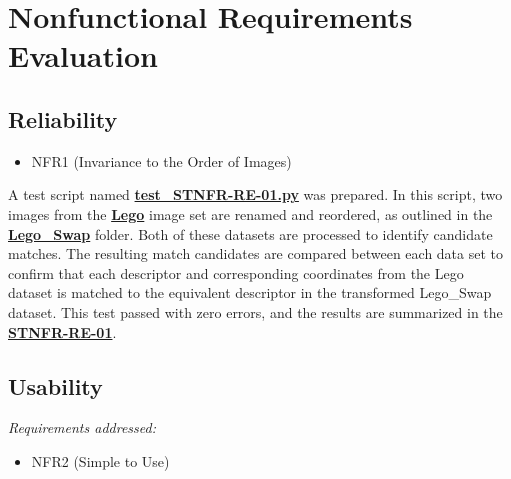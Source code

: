 \documentclass[12pt, titlepage]{article}
\begin{document}
\section{Nonfunctional Requirements Evaluation}
\subsection{Reliability}
\begin{itemize}
  \item NFR1 (Invariance to the Order of Images)
  \end{itemize}
A test script named \href{https://github.com/KiranSingh15/CAS-741-Image-Correspondences/blob/main/src/tests/test_STNFR-RE-01.py}{\textbf{test\_STNFR-RE-01.py}} was prepared. In this script, two images from the \href{https://github.com/KiranSingh15/CAS-741-Image-Correspondences/tree/main/src/tests/testImages/lego}{\textbf{Lego}} image set are renamed and reordered, as outlined in the \href{https://github.com/KiranSingh15/CAS-741-Image-Correspondences/tree/main/src/tests/testImages/lego_swap}{\textbf{Lego\_Swap}} folder. Both of these datasets are processed to identify candidate matches. The resulting match candidates are compared between each data set to confirm that each descriptor and corresponding coordinates from the Lego dataset is matched to the equivalent descriptor in the transformed Lego\_Swap dataset. This test passed with zero errors, and the results are summarized in the \href{https://github.com/KiranSingh15/CAS-741-Image-Correspondences/tree/main/src/tests/Outputs/2025-04-13_15-19-26}{\textbf{STNFR-RE-01}}.

\subsection{Usability}
\textit{Requirements addressed:}
\begin{itemize}
  \item NFR2 (Simple to Use)
\end{itemize}
\end{document}
